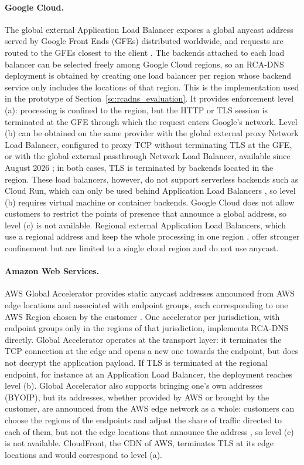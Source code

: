 \paragraph{Google Cloud.} The global external Application Load Balancer exposes a global anycast address served by Google Front Ends (GFEs) distributed worldwide, and requests are routed to the GFEs closest to the client \cite{ApplicationDocumentation, ForwardingDocumentation}. The backends attached to each load balancer can be selected freely among Google Cloud regions, so an RCA-DNS deployment is obtained by creating one load balancer per region whose backend service only includes the locations of that region. This is the implementation used in the prototype of Section~\ref{sc:rcadns_evaluation}. It provides enforcement level (a): processing is confined to the region, but the HTTP or TLS session is terminated at the GFE through which the request enters Google's network. Level (b) can be obtained on the same provider with the global external proxy Network Load Balancer, configured to proxy TCP without terminating TLS at the GFE, or with the global external passthrough Network Load Balancer, available since August 2026 \cite{ExternalDocumentation, CloudDocumentation}; in both cases, TLS is terminated by backends located in the region. These load balancers, however, do not support serverless backends such as Cloud Run, which can only be used behind Application Load Balancers \cite{ServerlessDocumentation}, so level (b) requires virtual machine or container backends. Google Cloud does not allow customers to restrict the points of presence that announce a global address, so level (c) is not available. Regional external Application Load Balancers, which use a regional address and keep the whole processing in one region \cite{ForwardingDocumentation}, offer stronger confinement but are limited to a single cloud region and do not use anycast.

\paragraph{Amazon Web Services.} AWS Global Accelerator provides static anycast addresses announced from AWS edge locations and associated with endpoint groups, each corresponding to one AWS Region chosen by the customer \cite{HowAccelerator}. One accelerator per jurisdiction, with endpoint groups only in the regions of that jurisdiction, implements RCA-DNS directly. Global Accelerator operates at the transport layer: it terminates the TCP connection at the edge and opens a new one towards the endpoint, but does not decrypt the application payload. If TLS is terminated at the regional endpoint, for instance at an Application Load Balancer, the deployment reaches level (b). Global Accelerator also supports bringing one's own addresses (BYOIP), but its addresses, whether provided by AWS or brought by the customer, are announced from the AWS edge network as a whole: customers can choose the regions of the endpoints and adjust the share of traffic directed to each of them, but not the edge locations that announce the address \cite{HowAccelerator}, so level (c) is not available. CloudFront, the CDN of AWS, terminates TLS at its edge locations and would correspond to level (a).

